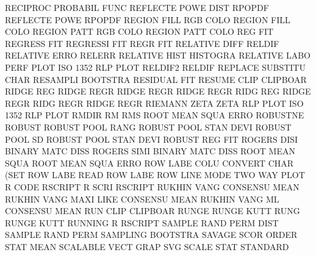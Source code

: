 RECIPROC                                PROBABIL FUNC
REFLECTE POWE DIST                      RPOPDF
REFLECTE POWE                           RPOPDF
REGION   FILL RGB  COLO                 REGION   FILL COLO
REGION   PATT RGB  COLO                 REGION   PATT COLO
REG                                     FIT
REGRESS                                 FIT
REGRESSI                                FIT
REGR                                    FIT
RELATIVE DIFF                           RELDIF
RELATIVE ERRO                           RELERR
RELATIVE HIST                           HISTOGRA
RELATIVE LABO PERF PLOT                 ISO      1352 RLP  PLOT
RELDIF2                                 RELDIF
REPLACE                                 SUBSTITU CHAR
RESAMPLI                                BOOTSTRA
RESIDUAL                                FIT
RESUME   CLIP                           CLIPBOAR
RIDGE    REG                            RIDGE    REGR
RIDGE    REGR                           RIDGE    REGR
RIDG     REG                            RIDGE    REGR
RIDG     REGR                           RIDGE    REGR
RIEMANN  ZETA                           ZETA
RLP      PLOT                           ISO      1352 RLP  PLOT
RMDIR                                   RM
RMS                                     ROOT     MEAN SQUA ERRO
ROBUSTNE                                ROBUST
ROBUST   POOL RANG                      ROBUST   POOL STAN DEVI
ROBUST   POOL SD                        ROBUST   POOL STAN DEVI
ROBUST   REG                            FIT
ROGERS   DISI                           BINARY   MATC DISS
ROGERS   SIMI                           BINARY   MATC DISS
ROOT     MEAN SQUA                      ROOT     MEAN SQUA ERRO
ROW      LABE COLU                      CONVERT  CHAR (SET
ROW      LABE                           READ     ROW  LABE
ROW      LINE MODE                      TWO      WAY  PLOT
R        CODE                           RSCRIPT
R        SCRI                           RSCRIPT
RUKHIN   VANG                           CONSENSU MEAN
RUKHIN   VANG MAXI LIKE                 CONSENSU MEAN
RUKHIN   VANG ML                        CONSENSU MEAN
RUN      CLIP                           CLIPBOAR
RUNGE                                   RUNGE    KUTT
RUNG                                    RUNGE    KUTT
RUNNING  R                              RSCRIPT
SAMPLE   RAND PERM DIST                 SAMPLE   RAND PERM
SAMPLING                                BOOTSTRA
SAVAGE   SCOR                           ORDER    STAT MEAN
SCALABLE VECT GRAP                      SVG
SCALE    STAT                           STANDARD
